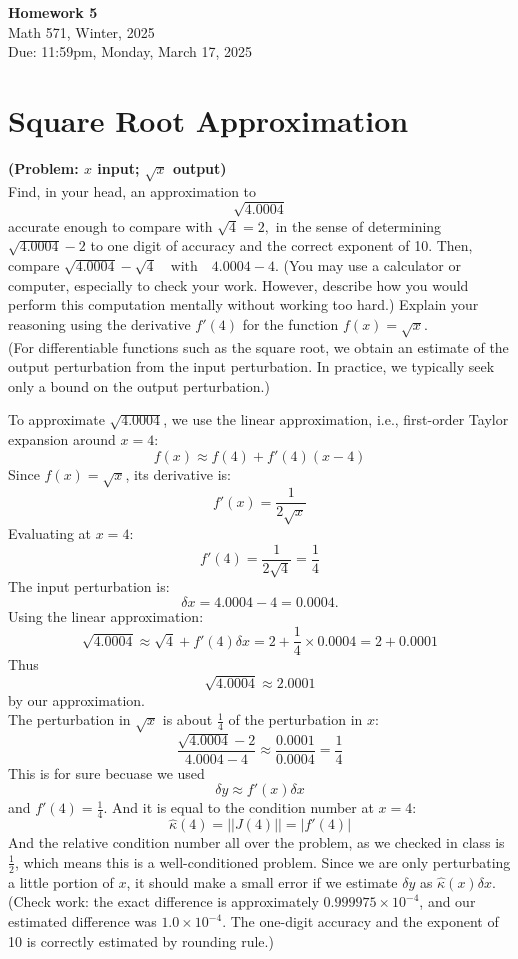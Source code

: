 \documentclass[lang=cn,11pt]{elegantbook}
\begin{document}
\begin{center}
  \Large \textbf{Homework 5} \\
  Math 571, Winter, 2025 \\
  Due: 11:59pm, Monday, March 17, 2025
\end{center}


\section{Square Root Approximation}
\textbf{(Problem: \(x\) input; \(\sqrt{x}\) output)}\\
Find, in your head, an approximation to 
\[
\sqrt{4.0004}
\]
accurate enough to compare with  \(\sqrt{4} = 2,\) in the sense of determining \(\sqrt{4.0004}-2\) to one digit of accuracy and the correct exponent of 10. Then, compare \(\sqrt{4.0004}-\sqrt{4} \quad \text{with} \quad 4.0004-4\).
(You may use a calculator or computer, especially to check your work. However, describe how you would perform this computation mentally without working too hard.) Explain your reasoning using the derivative \(f'(4)\) for the function \(f(x)=\sqrt{x}\).\\
(For differentiable functions such as the square root, we obtain an estimate of the output perturbation from the input perturbation. In practice, we typically seek only a bound on the output perturbation.)

\begin{solution}
To approximate \( \sqrt{4.0004} \), we use the linear approximation, i.e., first-order Taylor expansion around \( x = 4 \): \[
f(x) \approx f(4) + f'(4) (x - 4)
\]
Since \( f(x) = \sqrt{x} \), its derivative is: \[
f'(x) = \frac{1}{2\sqrt{x}}
\]Evaluating at \( x = 4 \): \[
f'(4) = \frac{1}{2\sqrt{4}} = \frac{1}{4}
\]
The input perturbation is: \[
\delta x = 4.0004 - 4 = 0.0004.
\]
Using the linear approximation: \[
\sqrt{4.0004} \approx \sqrt{4} + f'(4)\delta x = 2+ \frac{1}{4} \times 0.0004 = 2 + 0.0001
\]
Thus \[
\sqrt{4.0004}  \approx 2.0001
\]
by our approximation.\\
The perturbation in \( \sqrt{x} \) is about \( \frac{1}{4} \) of the perturbation in \( x \): \[
\frac{\sqrt{4.0004} - 2}{4.0004 - 4} \approx \frac{0.0001}{0.0004} = \frac{1}{4}
\]
This is for sure becuase we used \[
\delta y \approx f'(x) \delta x
\]
 and \( f'(4) = \frac{1}{4} \). And it is equal to the condition number at $x = 4$:\[
\hat\kappa (4)  = ||J(4)|| =  |f'(4)|
\]
And the relative condition number all over the problem, as we checked in class is $\frac{1}{2}$, which means this is a well-conditioned problem. Since we are only perturbating a little portion of $x$, it should make a small error if we estimate $\delta y $ as \( \hat\kappa (x)\delta x\). \\
(Check work: the exact difference is approximately \( 0.999975 \times 10^{-4} \), and our estimated difference was \( 1.0 \times 10^{-4} \). The one-digit accuracy and the exponent of 10 is correctly estimated by rounding rule.)
\end{solution}
\end{document}
